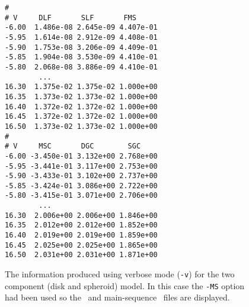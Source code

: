 \begin{figure}[p]
\begin{center}
\begin{verbatim}
#
# V     DLF       SLF       FMS
-6.00  1.486e-08 2.645e-09 4.407e-01
-5.95  1.614e-08 2.912e-09 4.408e-01
-5.90  1.753e-08 3.206e-09 4.409e-01
-5.85  1.904e-08 3.530e-09 4.410e-01
-5.80  2.068e-08 3.886e-09 4.410e-01
		...
16.30  1.375e-02 1.375e-02 1.000e+00
16.35  1.373e-02 1.373e-02 1.000e+00
16.40  1.372e-02 1.372e-02 1.000e+00
16.45  1.372e-02 1.372e-02 1.000e+00
16.50  1.373e-02 1.373e-02 1.000e+00
#
# V     MSC       DGC        SGC
-6.00 -3.450e-01 3.132e+00 2.768e+00
-5.95 -3.441e-01 3.117e+00 2.753e+00
-5.90 -3.433e-01 3.102e+00 2.737e+00
-5.85 -3.424e-01 3.086e+00 2.722e+00
-5.80 -3.415e-01 3.071e+00 2.706e+00
		...
16.30  2.006e+00 2.006e+00 1.846e+00
16.35  2.012e+00 2.012e+00 1.852e+00
16.40  2.019e+00 2.019e+00 1.859e+00
16.45  2.025e+00 2.025e+00 1.865e+00
16.50  2.031e+00 2.031e+00 1.871e+00
\end{verbatim}
\end{center}
\caption{The information produced using verbose mode ({\tt -v}) for the two
component (disk and spheroid) model. In this case the {\tt -MS} option had
been used so the \fms\ and main-sequence \cmd\ files are displayed.}
\end{figure}

